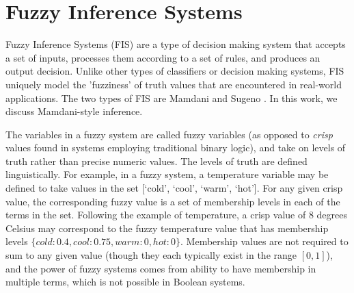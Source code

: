 \documentclass[12pt]{report}
\begin{document}
\section{Fuzzy Inference Systems}
Fuzzy Inference Systems (FIS) are a type of decision making system that accepts a set of inputs, processes them according to a set of rules, and produces an output decision. Unlike other types of classifiers or decision making systems, FIS uniquely model the 'fuzziness' of truth values that are encountered in real-world applications. The two types of FIS are Mamdani \cite{mamdani1975experiment} and Sugeno \cite{sugeno1985industrial}. In this work, we discuss Mamdani-style inference.

The variables in a fuzzy system are called fuzzy variables (as opposed to \emph{crisp} values found in systems employing traditional binary logic), and take on levels of truth rather than precise numeric values. The levels of truth are defined linguistically. For example, in a fuzzy system, a temperature variable may be defined to take values in the set [`cold', `cool', `warm', `hot']. For any given crisp value, the corresponding fuzzy value is a set of membership levels in each of the terms in the set. Following the example of temperature, a crisp value of 8 degrees Celsius may correspond to the fuzzy temperature value that has membership levels $\{cold: 0.4, cool: 0.75, warm: 0, hot: 0\}$. Membership values are not required to sum to any given value (though they each typically exist in the range $[0,1]$), and the power of fuzzy systems comes from ability to have membership in multiple terms, which is not possible in Boolean systems.
\end{document}
